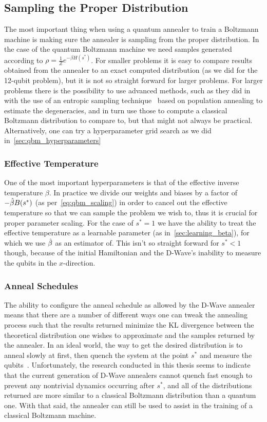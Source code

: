 \subsection{Sampling the Proper Distribution}
The most important thing when using a quantum annealer to train a Boltzmann machine is making sure the annealer is sampling from the proper distribution.
In the case of the quantum Boltzmann machine we need samples generated according to \( \rho = \frac{1}{Z} e^{-\beta H(s^*)} \).
For smaller problems it is easy to compare results obtained from the annealer to an exact computed distribution (as we did for the 12-qubit problem), but it is not so straight forward for larger problems.
For larger problems there is the possibility to use advanced methods, such as they did in~\cite{marshall_2019} with the use of an entropic sampling technique~\cite{barash_2019} based on population annealing to estimate the degeneracies, and in turn use those to compute a classical Boltzmann distribution to compare to, but that might not always be practical.
Alternatively, one can try a hyperparameter grid search as we did in~\cref{sec:qbm_hyperparameters}

\subsubsection{Effective Temperature}
One of the most important hyperparameters is that of the effective inverse temperature \( \beta \).
In practice we divide our weights and biases by a factor of \( -\hat{\beta} B(s^*) \) (as per~\cref{eq:qbm_scaling}) in order to cancel out the effective temperature so that we can sample the problem we wish to, thus it is crucial for proper parameter scaling.
For the case of \( s^* = 1 \) we have the ability to treat the effective temperature as a learnable parameter (as in~\cref{sec:learning_beta}), for which we use \( \hat{\beta} \) as an estimator of.
This isn't so straight forward for \( s^* < 1 \) though, because of the initial Hamiltonian and the D-Wave's inability to measure the qubits in the \( x \)-direction.

\subsubsection{Anneal Schedules}
The ability to configure the anneal schedule as allowed by the D-Wave annealer means that there are a number of different ways one can tweak the annealing process such that the results returned minimize the KL divergence between the theoretical distribution one wishes to approximate and the samples returned by the annealer.
In an ideal world, the way to get the desired distribution is to anneal slowly at first, then quench the system at the point \( s^* \) and measure the qubits~\cite{amin_2018}.
Unfortunately, the research conducted in this thesis seems to indicate that the current generation of D-Wave annealers cannot quench fast enough to prevent any nontrivial dynamics occurring after \( s^* \), and all of the distributions returned are more similar to a classical Boltzmann distribution than a quantum one.
With that said, the annealer can still be used to assist in the training of a classical Boltzmann machine.

